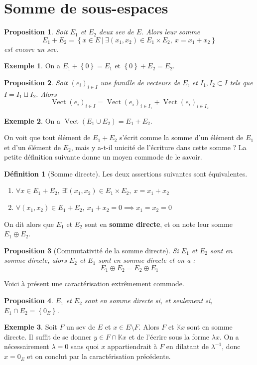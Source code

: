 \documentclass[french]{book}
\newcommand{\K}{\mathbb{K}}
\newcommand{\inv}{^{-1}}
\theoremstyle{plain}
\newtheorem{prop}{Proposition}[chapter]
\theoremstyle{definition}
\newtheorem{dfn}{Définition}[chapter]
\newtheorem{exa}{Exemple}[chapter]
\theoremstyle{remark}
\DeclareMathOperator{\vect}{Vect}
\begin{document}
\section{Somme de sous-espaces} %
\begin{prop}
	Soit $E_1$ et $E_2$ deux sev de $E$. Alors leur somme $$E_1+E_2=\left\{x\in E\ | \ \exists(x_1,x_2)\in E_1\times E_2,\ x=x_1+x_2\right\}$$ est encore un sev.
\end{prop}
\begin{exa}
	On a $E_1+\left\{0\right\}=E_1$ et $\left\{0\right\}+E_2=E_2$.
\end{exa}
\begin{prop}
	Soit $(e_i)_{i\in I}$ une famille de vecteurs de $E$, et $I_1,I_2\subset I$ tels que $I=I_1\sqcup I_2$. Alors $$\vect(e_i)_{i\in I}=\vect(e_i)_{i\in I_1}+\vect(e_i)_{i\in I_2}$$
\end{prop}
\begin{exa}
	On a $\vect(E_1\cup E_2)=E_1+E_2$.
\end{exa}
On voit que tout élément de $E_1+E_2$ s'écrit comme la somme d'un élément de $E_1$ et d'un élément de $E_2$, mais y a-t-il unicité de l'écriture dans cette somme ? La petite définition suivante donne un moyen commode de le savoir.
\begin{dfn}[Somme directe]
	Les deux assertions suivantes sont équivalentes.
	\begin{enumerate}
		\item $\forall x\in E_1+E_2,\ \exists!(x_1,x_2)\in E_1\times E_2,\ x=x_1+x_2$
		\item $\forall(x_1,x_2)\in E_1+E_2,\ x_1+x_2=0\implies x_1=x_2=0$
	\end{enumerate}
	On dit alors que $E_1$ et $E_2$ sont en \textbf{somme directe}, et on note leur somme $E_1\oplus E_2$.
\end{dfn}
\begin{prop}[Commutativité de la somme directe]
	Si $E_1$ et $E_2$ sont en somme directe, alors $E_2$ et $E_1$ sont en somme directe et on a : $$E_1\oplus E_2=E_2\oplus E_1$$
\end{prop}
Voici à présent une caractérisation extrêmement commode.
\begin{prop}
	$E_1$ et $E_2$ sont en somme directe si, et seulement si, $E_1\cap E_2=\left\{0_E\right\}$.
\end{prop}
\begin{exa}
	Soit $F$ un sev de $E$ et $x\in E\setminus F$. Alors $F$ et $\K x$ sont en somme directe. Il suffit de se donner $y\in F\cap \K x$ et de l'écrire sous la forme $\lambda x$. On a nécessairement $\lambda=0$ sans quoi $x$ appartiendrait à $F$ en dilatant de $\lambda\inv$, donc $x=0_E$ et on conclut par la caractérisation précédente.
\end{exa}
\end{document}
